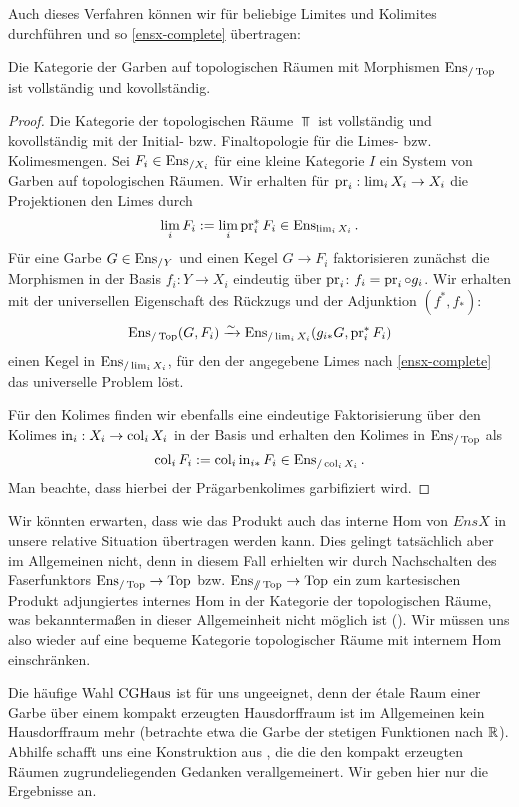Auch dieses Verfahren können wir für beliebige Limites und Kolimites
durchführen und so \ref{ensx-complete} übertragen:
\begin{satz} \label{enstop-complete}
  Die Kategorie der Garben auf topologischen Räumen mit Morphismen
  $\operatorname{Ens}_{/\operatorname{Top}}$ ist vollständig und kovollständig.
\end{satz}
\begin{proof}
  Die Kategorie der topologischen Räume $\Top$ ist vollständig und
  kovollständig mit der Initial- bzw. Finaltopologie für die Limes-
  bzw. Kolimesmengen. Sei $F_i \in \operatorname{Ens}_{/X_i}$ für eine kleine
  Kategorie $I$ ein System von Garben auf topologischen Räumen. Wir
  erhalten für $\operatorname{pr}_i: \lim_i X_i \to X_i$ die Projektionen den Limes
  durch
  \[ \lim_i F_i := \lim_i \operatorname{pr}_i^* F_i \in \operatorname{Ens}_{\lim_i X_i}. \]
  Für eine Garbe $G \in \operatorname{Ens}_{/Y}$ und einen Kegel $G \to F_i$
  faktorisieren zunächst die Morphismen in der Basis $f_i: Y \to X_i$
  eindeutig über $\operatorname{pr}_i$: $f_i = \operatorname{pr}_i \circ g_i$. Wir erhalten mit
  der universellen Eigenschaft des Rückzugs und der Adjunktion $(f^*,
  f_*)$:
  \[ \operatorname{Ens}_{/\operatorname{Top}}(G, F_i) \xrightarrow[]{\sim} \operatorname{Ens}_{/\lim_i X_i}(g_{i*} G, \operatorname{pr}_i^* F_i) \]
  einen Kegel in $\operatorname{Ens}_{/\lim_i X_i}$, für den der angegebene Limes
  nach \ref{ensx-complete} das universelle Problem löst.

  Für den Kolimes finden wir ebenfalls eine eindeutige Faktorisierung
  über den Kolimes $\operatorname{in}_i: X_i \to \operatorname{col}_i X_i$ in der Basis und
  erhalten den Kolimes in $\operatorname{Ens}_{/\operatorname{Top}}$ als
  \[ \operatorname{col}_i F_i := \operatorname{col}_i \operatorname{in}_{i*} F_i \in \operatorname{Ens}_{/\operatorname{col}_i X_i}. \]
  Man beachte, dass hierbei der Prägarbenkolimes garbifiziert wird.
\end{proof}

Wir könnten erwarten, dass wie das Produkt auch das interne Hom von
$EnsX$ in unsere relative Situation übertragen werden kann. Dies
gelingt tatsächlich aber im Allgemeinen nicht, denn in diesem Fall
erhielten wir durch Nachschalten des Faserfunktors $\operatorname{Ens}_{/\operatorname{Top}} \to
\operatorname{Top}$ bzw. $\operatorname{Ens}_{\mathbin{/\mkern-6mu/} \operatorname{Top}} \to \operatorname{Top}$ ein zum kartesischen Produkt
adjungiertes internes Hom in der Kategorie der topologischen Räume,
was bekanntermaßen in dieser Allgemeinheit nicht möglich ist
(\cite{???}). Wir müssen uns also wieder auf eine bequeme Kategorie
topologischer Räume mit internem Hom einschränken.

Die häufige Wahl $\operatorname{CGHaus}$ ist für uns ungeeignet, denn der étale Raum
einer Garbe über einem kompakt erzeugten Hausdorffraum ist im
Allgemeinen kein Hausdorffraum mehr (betrachte etwa die Garbe der
stetigen Funktionen nach $\mathbb{R}$). Abhilfe schafft uns eine Konstruktion
aus \cite{Vogt}, die die den kompakt erzeugten Räumen
zugrundeliegenden Gedanken verallgemeinert. Wir geben hier nur die
Ergebnisse an.

